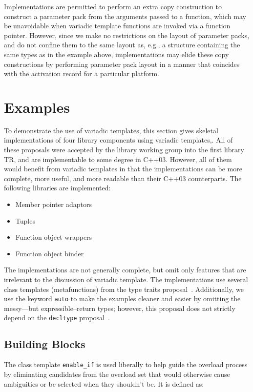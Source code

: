 \documentclass{article}
\begin{document}
Implementations are permitted to perform an extra copy construction to
construct a parameter pack from the arguments passed to a function,
which may be unavoidable when variadic template functions are invoked
via a function pointer. However, since we make no restrictions on the
layout of parameter packs, and do not confine them to the same layout
as, e.g., a structure containing the same types as in the example
above, implementations may elide these copy constructions by
performing parameter pack layout in a manner that coincides with the
activation record for a particular platform.

\section{Examples}
To demonstrate the use of variadic templates, this section gives
skeletal implementations of four library components using variadic
templates,. All of these proposals were accepted by the library
working group into the first library TR, and are implementable to some
degree in C++03. However, all of them would benefit from variadic
templates in that the implementations can be more complete, more
useful, and more readable than their C++03 counterparts. The following
libraries are implemented:

\begin{itemize}
\item Member pointer adaptors~\cite{Dimov03a}
\item Tuples~\cite{Jarvi02}
\item Function object wrappers~\cite{Gregor02}
\item Function object binder~\cite{Dimov03b}
\end{itemize}

The implementations are not generally complete, but omit only features
that are irrelevant to the discussion of variadic template. The
implementations use several class templates (metafunctions) from the
type traits proposal~\cite{Maddock03}. Additionally, we use the
keyword {\tt auto} to make the examples cleaner and easier by omitting
the messy---but expressible--return types; however, this proposal does
not strictly depend on the {\tt decltype} proposal~\cite{Jarvi03}.

\subsection{Building Blocks}
\label{building_blocks}
The class template {\tt enable\_if} is used liberally to help guide
the overload process by eliminating candidates from the overload set
that would otherwise cause ambiguities or be selected when they
shouldn't be. It is defined as:
\end{document}
